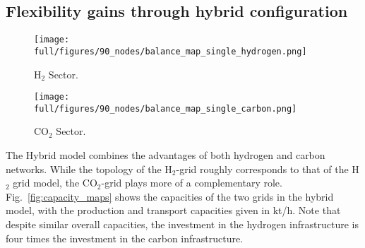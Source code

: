 \documentclass[twocolumn]{article}
\newcommand{\carbon}{CO$_2$}
\newcommand{\hydrogen}{H$_2$}
\begin{document}
\subsection*{Flexibility gains through hybrid configuration}

\begin{figure*}[ht!]
    \centering
    \begin{subfigure}{.49\textwidth}
        \centering
        \texttt{[image: full/figures/90\_nodes/balance\_map\_single\_hydrogen.png]}
        \caption{\hydrogen{} Sector.}
        \label{fig:capacity_map_hydrogen_co2}
    \end{subfigure}
    \hfill
    \begin{subfigure}{.49\textwidth}
        \centering
        \texttt{[image: full/figures/90\_nodes/balance\_map\_single\_carbon.png]}
        \caption{\carbon{} Sector.}
        \label{fig:capacity_map_carbon_co2}
    \end{subfigure}%
    \caption{Optimal production and transport capacities of the carbon and hydrogen sector in a net-zero energy system in Europe with both \carbon{} and \hydrogen{} network expansion (Hybrid).
    }
    \label{fig:capacity_maps}
\end{figure*}


The Hybrid model combines the advantages of both hydrogen and carbon networks. While the topology of the \hydrogen{}-grid roughly corresponds to that of the \hydrogen{} grid model, the \carbon{}-grid plays more of a complementary role. Fig.~\ref{fig:capacity_maps} shows the capacities of the two grids in the hybrid model, with the production and transport capacities given in kt/h. Note that despite similar overall capacities, the investment in the hydrogen infrastructure is four times the investment in the carbon infrastructure.
\end{document}
